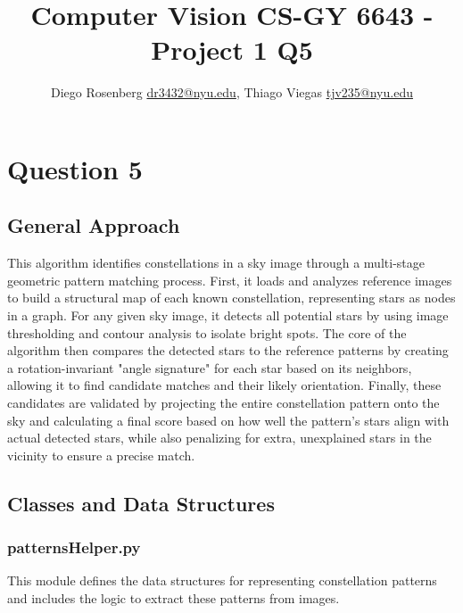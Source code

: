 \documentclass[a4paper,11pt]{article}
\makeatletter
\renewcommand{\maketitle}{\bgroup\setlength{\parindent}{0pt}
	\begin{flushleft}
		\thispagestyle{plain}
		\textbf{\@title}
		
		\@author
	\end{flushleft}\egroup
}
\makeatother
\begin{document}
	
	\title{\Large Computer Vision CS-GY 6643 - Project 1 Q5
		\newline}
	\author{Diego Rosenberg \href{mailto:dr3432@nyu.edu}{dr3432@nyu.edu}, Thiago Viegas \href{mailto:tjv235@nyu.edu}{tjv235@nyu.edu}}
	
	
	
	\date{}
	
	\maketitle
	\section{Question 5}
	\subsection{General Approach}
	This algorithm identifies constellations in a sky image through a multi-stage geometric pattern matching process. First, it loads and analyzes reference images to build a structural map of each known constellation, representing stars as nodes in a graph. For any given sky image, it detects all potential stars by using image thresholding and contour analysis to isolate bright spots. The core of the algorithm then compares the detected stars to the reference patterns by creating a rotation-invariant "angle signature" for each star based on its neighbors, allowing it to find candidate matches and their likely orientation. Finally, these candidates are validated by projecting the entire constellation pattern onto the sky and calculating a final score based on how well the pattern's stars align with actual detected stars, while also penalizing for extra, unexplained stars in the vicinity to ensure a precise match.
	
	\subsection{Classes and Data Structures}
	\subsubsection*{patternsHelper.py}
	\hrulefill
	
	This module defines the data structures for representing constellation patterns and includes the logic to extract these patterns from images.
	
\end{document}
